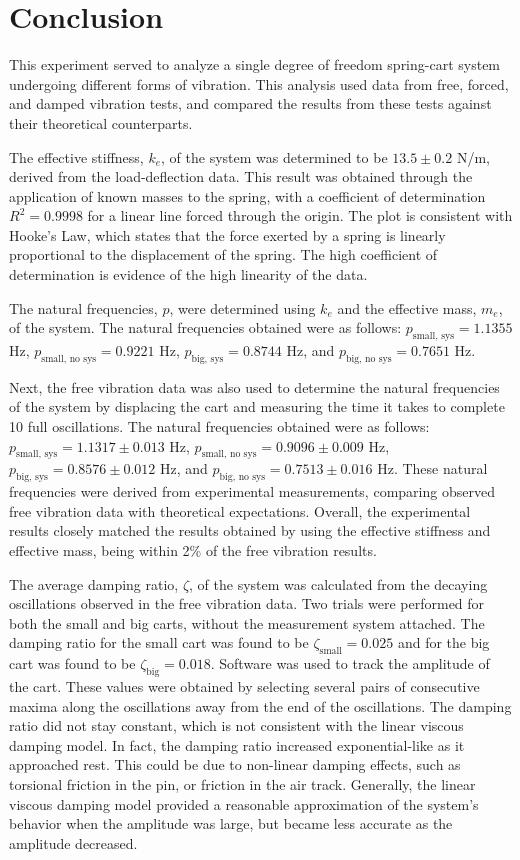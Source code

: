\section{Conclusion}
This experiment served to analyze a single degree of freedom spring-cart system undergoing different forms of vibration. This analysis used data from free, forced, and damped vibration tests, and compared the results from these tests against their theoretical counterparts.

The effective stiffness, $k_e$, of the system was determined to be $13.5 \pm 0.2$ N/m, derived from the load-deflection data. This result was obtained through the application of known masses to the spring, with a coefficient of determination $R^2 = 0.9998$ for a linear line forced through the origin. The plot is consistent with Hooke's Law, which states that the force exerted by a spring is linearly proportional to the displacement of the spring. The high coefficient of determination is evidence of the high linearity of the data.

The natural frequencies, $p$, were determined using $k_e$ and the effective mass, $m_e$, of the system. The natural frequencies obtained were as follows: $p_{\text{small, sys}} = 1.1355$ Hz, $p_{\text{small, no sys}} = 0.9221$ Hz, $p_{\text{big, sys}} = 0.8744$ Hz, and $p_{\text{big, no sys}} = 0.7651$ Hz. 

Next, the free vibration data was also used to determine the natural frequencies of the system by displacing the cart and measuring the time it takes to complete 10 full oscillations. The natural frequencies obtained were as follows: $p_{\text{small, sys}} = 1.1317 \pm 0.013$ Hz, $p_{\text{small, no sys}} = 0.9096 \pm 0.009$ Hz, $p_{\text{big, sys}} = 0.8576 \pm 0.012$ Hz, and $p_{\text{big, no sys}} = 0.7513 \pm 0.016$ Hz. These natural frequencies were derived from experimental measurements, comparing observed free vibration data with theoretical expectations. Overall, the experimental results closely matched the results obtained by using the effective stiffness and effective mass, being within 2\% of the free vibration results.

The average damping ratio, $\zeta$, of the system was calculated from the decaying oscillations observed in the free vibration data. Two trials were performed for both the small and big carts, without the measurement system attached. The damping ratio for the small cart was found to be $\zeta_{\text{small}} = 0.025$ and for the big cart was found to be $\zeta_{\text{big}} = 0.018$. Software was used to track the amplitude of the cart. These values were obtained by selecting several pairs of consecutive maxima along the oscillations away from the end of the oscillations. The damping ratio did not stay constant, which is not consistent with the linear viscous damping model. In fact, the damping ratio increased exponential-like as it approached rest.  This could be due to non-linear damping effects, such as torsional friction in the pin, or friction in the air track. Generally, the linear viscous damping model provided a reasonable approximation of the system's behavior when the amplitude was large, but became less accurate as the amplitude decreased.

